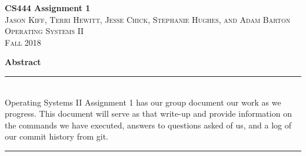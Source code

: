 \documentclass{article}
\begin{document}

\begin{titlepage}
\vspace*{\fill}

\newcommand{\HRule}{\rule{\linewidth}{0.5mm}} %

\center %


{ \huge \bfseries CS444 Assignment 1}\\[0.4cm] %


\textsc{\LARGE Jason Kiff, Terri Hewitt, Jesse Chick, Stephanie Hughes, and Adam Barton}\\[0.5cm] %
\textsc{\Large Operating Systems II}\\[0.5cm] %
\textsc{\large Fall 2018}\\[2.5cm] %


\begin{minipage}{.6\textwidth}
\textbf{\large Abstract} \\
\HRule \\[0.4cm]
Operating Systems II Assignment 1 has our group document our work as we progress. This document will serve as that write-up and provide information on the commands we have executed, answers to questions asked of us, and a log of our commit history from git.
\\[0.4cm]
\HRule \\[1.5cm]
\end{minipage}



\end{titlepage}
\end{document}
